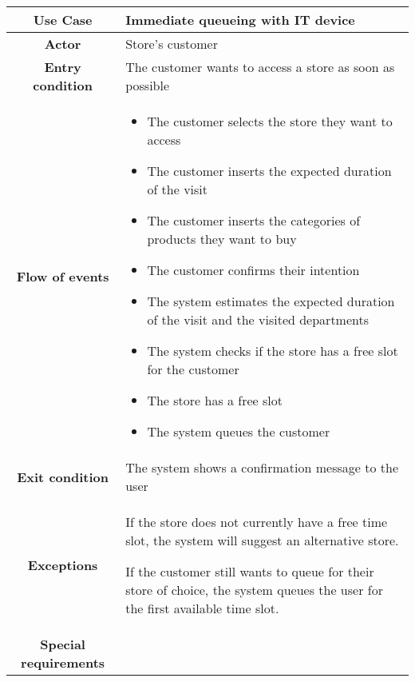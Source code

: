 \documentclass[../../main.tex]{subfiles}
\begin{document}
      \begin{table}[H]
        \centering
          \begin{tabular}{c m{}}
          \hline
          \textbf{Use Case} & Immediate queueing with IT device\\ \hline
          \textbf{Actor} & Store's customer\\ \hline
          \textbf{Entry condition} & The customer wants to access a store as soon as possible\\  \hline
          \textbf{Flow of events} & \begin{itemize}
                                      \item The customer selects the store they want to access
                                      \item The customer inserts the expected duration of the visit
                                      \item The customer inserts the categories of products they want to buy
                                      \item The customer confirms their intention
                                      \item The system estimates the expected duration of the visit and the visited departments
                                      \item The system checks if the store has a free slot for the customer
                                      \item The store has a free slot
                                      \item The system queues the customer
                                    \end{itemize}\\ \hline
          \textbf{Exit condition} & The system shows a confirmation message to the user \\ \hline
          \textbf{Exceptions} &  If the store does not currently have a free time slot, the system will suggest an alternative store.
                                  
                                If the customer still wants to queue for their store of choice, the system queues the user for the first available time slot. \\ \hline
          \textbf{Special requirements} &\\ \hline
          \end{tabular}
      \end{table}
\end{document}
